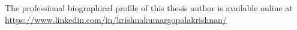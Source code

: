 
\cleardoublepage

\newpage\null\thispagestyle{plain}
\vfill
\parbox{130mm}{
    \doublespacing
    \noindent The professional biographical profile of this thesis author is available online at
    \url{https://www.linkedin.com/in/krishnakumargopalakrishnan/}
}
    \blackurl
    \regularurl
\newpage

